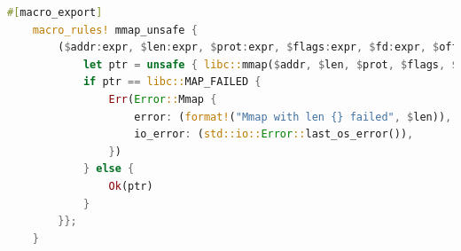 \begin{lstlisting}[language=Rust,caption={Syscall \texttt{mmap} macro, with own error variant}, label=lst:mmapmacro]
    #[macro_export]
    macro_rules! mmap_unsafe {
        ($addr:expr, $len:expr, $prot:expr, $flags:expr, $fd:expr, $offset:expr) => {{
            let ptr = unsafe { libc::mmap($addr, $len, $prot, $flags, $fd, $offset) };
            if ptr == libc::MAP_FAILED {
                Err(Error::Mmap {
                    error: (format!("Mmap with len {} failed", $len)),
                    io_error: (std::io::Error::last_os_error()),
                })
            } else {
                Ok(ptr)
            }
        }};
    } 
\end{lstlisting}

